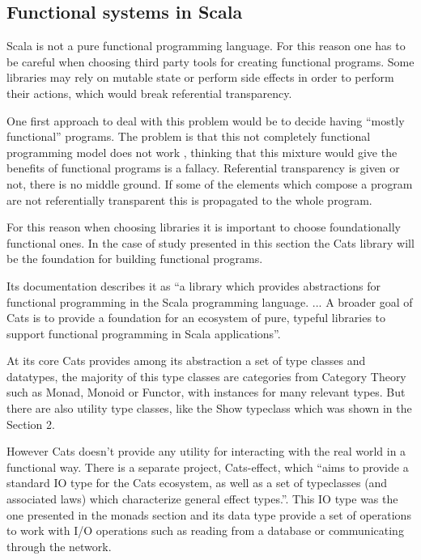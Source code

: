 \documentclass[../main.tex]{subfiles}
\begin{document}
\subsection{Functional systems in Scala}
Scala is not a pure functional programming language. For this reason one has to
be careful when choosing third party tools for creating functional programs.
Some libraries may rely on mutable state or perform side effects in order to
perform their actions, which would break referential transparency.

One first approach to deal with this problem would be to decide having ``mostly
functional'' programs. The problem is that this not completely functional
programming model does not work \autocite{MeijerTheWork}, thinking that
this mixture would give the benefits of functional programs is a
fallacy. Referential transparency is given or not, there is no middle ground. If
some of the elements which compose a program are not referentially transparent
this is propagated to the whole program.

For this reason when choosing libraries it is important to choose foundationally
functional ones. In the case of study presented in this section the Cats library
\autocite{Cats:Home} will be the foundation for building functional programs.

Its documentation describes it as ``a library which provides abstractions for
functional programming in the Scala programming language. ... A broader goal of
Cats is to provide a foundation for an ecosystem of pure, typeful libraries to
support functional programming in Scala applications''.

At its core Cats provides among its abstraction a set of type classes and
datatypes, the majority of this type classes are categories from Category Theory
such as Monad, Monoid or Functor, with instances for many relevant types. But
there are also utility type classes, like the Show typeclass which was shown in
the Section 2.

However Cats doesn't provide any utility for interacting with the real world in
a functional way. There is a separate project, Cats-effect, which ``aims to
provide a standard IO type for the Cats ecosystem, as well as a set
of typeclasses (and associated laws) which characterize general effect types.''.
This IO type was the one presented in the monads section and its data type
provide a set of operations to work with I/O operations such as reading from a
database or communicating through the network.
\end{document}
